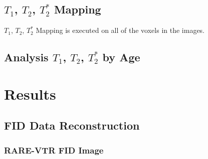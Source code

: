 \documentclass[10pt, a4paper]{article}
\begin{document}
			
		
		\subsection{$T_1$, $T_2$, $T_2^*$ Mapping}
			$T_1$, $T_2$, $T_2^*$ Mapping is executed on all of the voxels in the images. 
		
			
		
		\subsection{Analysis $T_1$, $T_2$, $T_2^*$  by Age}
	
	\section{Results}
		\subsection{FID Data Reconstruction}
			\subsubsection{RARE-VTR FID Image}
				
\end{document}
